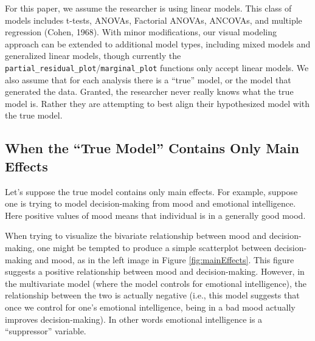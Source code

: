 \documentclass[
  man,floatsintext]{apa6}
\begin{document}
For this paper, we assume the researcher is using linear models. This class of models includes t-tests, ANOVAs, Factorial ANOVAs, ANCOVAs, and multiple regression (Cohen, 1968). With minor modifications, our visual modeling approach can be extended to additional model types, including mixed models and generalized linear models, though currently the \texttt{partial\_residual\_plot}/\texttt{marginal\_plot} functions only accept linear models. We also assume that for each analysis there is a ``true'' model, or the model that generated the data. Granted, the researcher never really knows what the true model is. Rather they are attempting to best align their hypothesized model with the true model.

\subsection{When the ``True Model'' Contains Only Main Effects}\label{when-the-true-model-contains-only-main-effects}

Let's suppose the true model contains only main effects. For example, suppose one is trying to model decision-making from mood and emotional intelligence. Here positive values of mood means that individual is in a generally good mood.

When trying to visualize the bivariate relationship between mood and decision-making, one might be tempted to produce a simple scatterplot between decision-making and mood, as in the left image in Figure \ref{fig:mainEffects}. This figure suggests a positive relationship between mood and decision-making. However, in the multivariate model (where the model controls for emotional intelligence), the relationship between the two is actually negative (i.e., this model suggests that once we control for one's emotional intelligence, being in a bad mood actually improves decision-making). In other words emotional intelligence is a ``suppressor'' variable.
\end{document}
